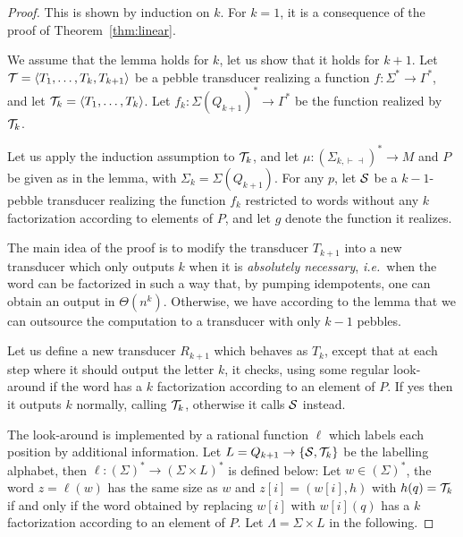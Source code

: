\begin{proof}
    This is shown by induction on $k$.
    For $k=1$, it is a consequence of the proof of Theorem~\ref{thm:linear}.

    We assume that the lemma holds for $k$, let us show that it holds for $k+1$.
    Let ${\mathcal T}=\langle T_1,\ldots,T_k,T_{k+1} \rangle$ be a pebble transducer realizing a function $f:\Sigma^*\rightarrow\Gamma^*$, and let ${\mathcal T}_k=\langle T_1,\ldots,T_k \rangle$. Let $f_k:\Sigma(Q_{k+1})^*\rightarrow \Gamma^*$ be the function realized by ${\mathcal T}_k$.

    Let us apply the induction assumption to ${\mathcal T}_k$, and let $\mu:(\Sigma_{k,\vdash\dashv})^*\rightarrow M$ and $P$ be given as in the lemma, with $\Sigma_k=\Sigma(Q_{k+1})$. For any $p$, let ${\mathcal S}$ be a $k{-}1$-pebble transducer realizing the function $f_k$ restricted to words without any $k$ factorization according to elements of $P$, and let $g$ denote the function it realizes.

    The main idea of the proof is to modify the transducer $T_{k+1}$ into a new transducer which only outputs $k$ when it is \emph{absolutely necessary}, \textit{i.e.}~when the word can be factorized in such a way that, by pumping idempotents, one can obtain an output in $\Theta(n^k)$.
    Otherwise, we have according to the lemma that we can outsource the computation to a transducer with only $k-1$ pebbles.

    Let us define a new transducer $R_{k+1}$ which behaves as $T_{k}$, except that at each step where it should output the letter $k$, it checks, using some regular look-around if the word has a $k$ factorization according to an element of $P$. If yes then it outputs $k$ normally, calling ${\mathcal T}_k$, otherwise it calls ${\mathcal S}$ instead.

    The look-around is implemented by a rational function $\ell$ which labels each position by additional information.
    Let $L=Q_{k+1}\rightarrow \{{\mathcal S},{\mathcal T}_k\}$ be the labelling alphabet, then $\ell:(\Sigma)^*\rightarrow (\Sigma\times L)^*$ is defined below:
    Let $w\in (\Sigma)^*$, the word $z=\ell(w)$ has the same size as $w$ and $z[i]=(w[i],h)$ with $h(q)={\mathcal T}_k$ if and only if the word obtained by replacing $w[i]$ with $w[i](q)$ has a $k$ factorization according to an element of $P$.
    Let $\Lambda=\Sigma\times L$ in the following.



\end{proof}
